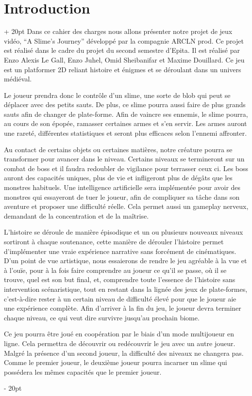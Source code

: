 \documentclass[a4paper, 12pt, twoside]{article}
\newcommand{\ind}[1][20pt]{\advance\leftskip + #1}
\newcommand{\deind}[1][20pt]{\advance\leftskip - #1}
\newenvironment{indt}[2][20pt]{#2 \par \ind[#1]}{\par \deind} %
\begin{document}
    

    \tableofcontents
    \newpage

    \begin{indt}{\section{Introduction}}
        Dans ce cahier des charges nous allons présenter notre projet de jeux vidéo, “A Slime's Journey” développé par la compagnie ARCLN prod. Ce projet est réalisé dans le cadre du projet du second semestre d'Epita. Il est réalisé par Enzo Alexis Le Gall, Enzo Juhel, Omid Sheibanifar et Maxime Douillard. Ce jeu est un platformer 2D reliant histoire et énigmes et se déroulant dans un univers médiéval.

        Le joueur prendra donc le contrôle d'un slime, une sorte de blob qui peut se déplacer avec des petits sauts. De plus, ce slime pourra aussi faire de plus grands sauts afin de changer de plate-forme. Afin de vaincre ses ennemis, le slime pourra, au cours de son épopée, ramasser certaines armes et s'en servir. Les armes auront une rareté, différentes statistiques et seront plus efficaces selon l'ennemi affronter.

        Au contact de certains objets ou certaines matières, notre créature pourra se transformer pour avancer dans le niveau. Certains niveaux se termineront sur un combat de boss et il faudra redoubler de vigilance pour terrasser ceux ci. Les boss auront des capacités uniques, plus de vie et infligeront plus de dégâts que les monstres habituels. Une intelligence artificielle sera implémentée pour avoir des monstres qui essayeront de tuer le joueur, afin de  compliquer sa tâche dans son aventure et proposer une difficulté réelle. Cela permet aussi un gameplay nerveux, demandant de la concentration et de la maîtrise.

        L'histoire se déroule de manière épisodique et un ou plusieurs nouveaux niveaux sortiront à chaque soutenance, cette manière de dérouler l'histoire permet d'implémenter une vraie expérience narrative sans forcément de cinématiques. D'un point de vue artistique, nous essaierons de rendre le jeu agréable à la vue et à l'ouïe, pour à la fois faire comprendre au joueur ce qu'il se passe, où il se trouve, quel est son but final, et, comprendre toute l'essence de l'histoire sans intervention scénaristique, tout en restant dans la lignée des jeux de plate-formes, c'est-à-dire rester à un certain niveau de difficulté élevé pour que le joueur aie une expérience complète. Afin d'arriver à la fin du jeu, le joueur devra terminer chaque niveau, ce qui veut dire survivre jusqu'au prochain biome.

        Ce jeu pourra être joué en coopération par le biais d'un mode multijoueur en ligne. Cela permettra de découvrir ou redécouvrir le jeu avec un autre joueur. Malgré la présence d'un second joueur, la difficulté des niveaux ne changera pas. Comme le premier joueur, le deuxième joueur pourra incarner un slime qui possédera les mêmes capacités que le premier joueur.

    \end{indt}
\end{document}

